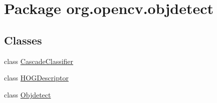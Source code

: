 \hypertarget{namespaceorg_1_1opencv_1_1objdetect}{}\section{Package org.\+opencv.\+objdetect}
\label{namespaceorg_1_1opencv_1_1objdetect}
\subsection*{Classes}
\begin{DoxyCompactItemize}
\item 
class \mbox{\hyperlink{classorg_1_1opencv_1_1objdetect_1_1_cascade_classifier}{Cascade\+Classifier}}
\item 
class \mbox{\hyperlink{classorg_1_1opencv_1_1objdetect_1_1_h_o_g_descriptor}{H\+O\+G\+Descriptor}}
\item 
class \mbox{\hyperlink{classorg_1_1opencv_1_1objdetect_1_1_objdetect}{Objdetect}}
\end{DoxyCompactItemize}
